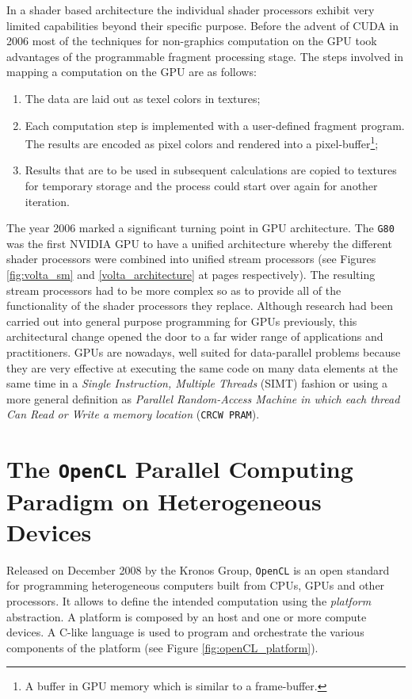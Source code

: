 \begin{description}
    In a shader based architecture the individual shader processors exhibit very limited capabilities beyond their specific purpose.
    Before the advent of CUDA in 2006 most of the techniques for non-graphics
    computation on the GPU took advantages of the programmable fragment processing stage. The steps involved in mapping a computation on the GPU are
    as follows:
    \begin{enumerate}
    	\item The data are laid out as texel colors in textures;
    	\item  Each computation step is implemented with a
    	user-defined fragment program. The results are encoded as pixel colors and rendered into a  pixel-buffer\footnote{ A buffer in GPU memory which is similar to a frame-buffer.}; 
    	\item Results that are
    	to be used in subsequent calculations are copied to textures for temporary storage and the process could start over again for another iteration.
    \end{enumerate} 
    
    The year 2006 marked a significant turning point in GPU architecture. The \texttt{G80}  was the first \textsc{NVIDIA} GPU to have a unified architecture whereby the different shader processors were  combined into unified stream processors (see Figures \ref{fig:volta_sm} and \ref{volta_architecture} at pages \pageref{fig:volta_sm}  \pageref{volta_architecture} respectively). The resulting stream processors had to be more complex so as to provide all of the functionality of the shader processors they replace. Although research had been carried out into general purpose programming
    for GPUs previously, this architectural change opened the door to a far wider range of  applications and practitioners.
    GPUs are nowadays, well suited for data-parallel problems because they are very effective at executing the same code on many data elements at the same time  in a \textit{Single Instruction, Multiple Threads} (SIMT) fashion or using a more general definition as \textit{Parallel Random-Access Machine in which each thread Can Read or Write a memory location} (\texttt{CRCW PRAM}).
    
    
    \section{The \texttt{OpenCL} Parallel Computing Paradigm on Heterogeneous Devices}
    Released on December 2008 by the Kronos Group, \texttt{OpenCL} \cite{Gaster:2011:HCO:2046379,Stone:2010:OPP:622179.1803953,Munshi:2011:OPG:2049883} is an open standard for programming heterogeneous computers built from CPUs, GPUs and other processors. It allows to define the intended computation using the \textit{platform} abstraction. A platform is composed by an host and one or more compute devices. A C-like language is used to program and orchestrate the various components of the platform (see Figure \ref{fig:openCL_platform}).
    

\end{description}
